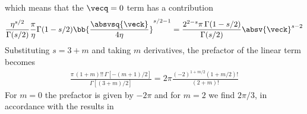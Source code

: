 which means that the $\vecq=0$ term has a contribution
\begin{align}
\frac{\eta^{s/2}}{\Gamma(s/2)} \frac{\pi}{\eta} \Gamma(1-s/2) \bb{\frac{\absvsq{\veck}}{4\eta}}^{s/2-1} = \frac{2^{2-s}\pi\, \Gamma(1-s/2)}{\Gamma(s/2)} \absv{\veck}^{s-2}
\end{align}
Substituting $s=3+m$ and taking $m$ derivatives, the prefactor of the linear term becomes
\begin{align}
    \frac{\pi\, (1+m)!! \,\Gamma[-(m+1)/2]}{\Gamma[(3+m)/2]} = 2\pi \frac{(-2)^{1+m/2} (1+m/2)!}{(2+m)!}
\end{align}
For $m=0$ the prefactor is given by $-2\pi$ and for $m=2$ we find $2\pi/3$, in accordance with
the results in 

